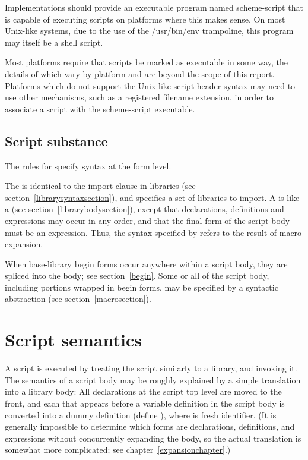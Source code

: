 Implementations should provide an executable program named {\cf scheme-script}
that is capable of executing scripts on platforms where this makes
sense.  On most Unix-like systems, due to the 
use of the {\cf /usr/bin/env} trampoline, this program may itself be a shell 
script.

Most platforms require that scripts be marked as executable in some way, 
the details of which vary by platform and are beyond the scope of this 
report. Platforms which do not support the Unix-like script header syntax 
may need to use other mechanisms, such as a registered filename extension, 
in order to associate a script with the {\cf scheme-script} executable.

\subsection{Script substance}

The rules for  specify syntax at the form level.

The  is identical to the import clause in
libraries (see section~\ref{librarysyntaxsection}), 
and specifies a set of libraries to import.  A  is like a  (see
section~\ref{librarybodysection}), except that declarations,
definitions and expressions may occur in any order, and that the final
form of the script body must be an expression.  Thus, the syntax
specified by  refers to the result of macro
expansion.

When base-library {\cf begin} forms occur anywhere within a script body,
they are spliced into the body; see section~\ref{begin}.
Some or all of the script body, including portions wrapped in {\cf begin}
forms, may be specified by a syntactic abstraction
(see section~\ref{macrosection}).

\section{Script semantics}

A script is executed by treating the script similarly to a library, and
invoking it.  The semantics of a script body may be roughly explained by
a simple translation into a library body: All declarations at the script top
level are moved to the front, and
each  that appears before a
variable definition in
the script body is converted into a dummy definition 
{\cf (define  )},
where  is fresh identifier.
(It is generally impossible to determine which forms are declarations,
definitions, and expressions without concurrently expanding the body, so
the actual translation is somewhat more complicated; see
chapter~\ref{expansionchapter}.)

